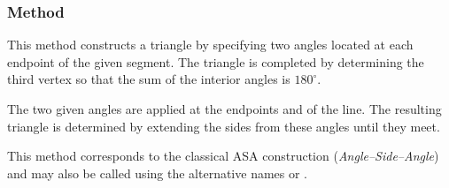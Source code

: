 \vspace{1em}
\begin{minipage}{.5\textwidth}
\begin{center}
\end{center}

\end{minipage}
\begin{minipage}{.5\textwidth}
\begin{tkzexample}
\end{tkzexample}
\end{minipage}

\subsubsection{Method }
\label{ssub:triangle_with_two__angles}

This method constructs a triangle by specifying two angles located at each endpoint of the given segment. The triangle is completed by determining the third vertex so that the sum of the interior angles is $180^\circ$.

\medskip
\noindent
The two given angles are applied at the endpoints  and  of the line. The resulting triangle is determined by extending the sides from these angles until they meet.

\medskip
\noindent
This method corresponds to the classical ASA construction (\textit{Angle–Side–Angle}) and may also be called using the alternative names  or .

\vspace{1em}

